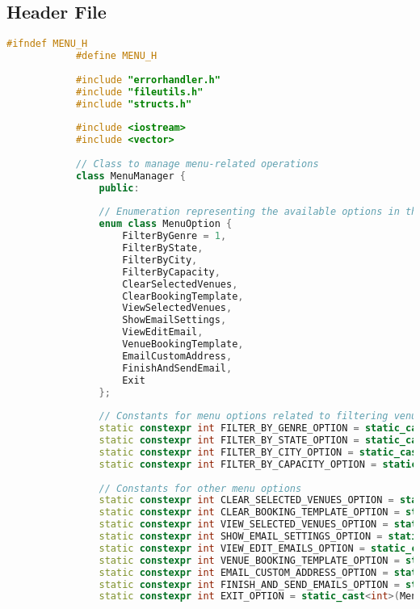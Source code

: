 \documentclass{article}
\begin{document}
	\subsection*{Header File}
	\begin{mdframed}[backgroundcolor=background, hidealllines=false, innerleftmargin=15pt, innerrightmargin=5pt, innertopmargin=0pt, innerbottommargin=-5pt, linecolor=accent]
		\begin{lstlisting}[language=C++]
			#ifndef MENU_H
			#define MENU_H
			
			#include "errorhandler.h"
			#include "fileutils.h"
			#include "structs.h"
			
			#include <iostream>
			#include <vector>
			
			// Class to manage menu-related operations
			class MenuManager {
				public:
				
				// Enumeration representing the available options in the main menu
				enum class MenuOption {
					FilterByGenre = 1,
					FilterByState,
					FilterByCity,
					FilterByCapacity,
					ClearSelectedVenues,
					ClearBookingTemplate,
					ViewSelectedVenues,
					ShowEmailSettings,
					ViewEditEmail,
					VenueBookingTemplate,
					EmailCustomAddress,
					FinishAndSendEmail,
					Exit
				};
				
				// Constants for menu options related to filtering venues
				static constexpr int FILTER_BY_GENRE_OPTION = static_cast<int>(MenuOption::FilterByGenre);
				static constexpr int FILTER_BY_STATE_OPTION = static_cast<int>(MenuOption::FilterByState);
				static constexpr int FILTER_BY_CITY_OPTION = static_cast<int>(MenuOption::FilterByCity);
				static constexpr int FILTER_BY_CAPACITY_OPTION = static_cast<int>(MenuOption::FilterByCapacity);
				
				// Constants for other menu options
				static constexpr int CLEAR_SELECTED_VENUES_OPTION = static_cast<int>(MenuOption::ClearSelectedVenues);
				static constexpr int CLEAR_BOOKING_TEMPLATE_OPTION = static_cast<int>(MenuOption::ClearBookingTemplate);
				static constexpr int VIEW_SELECTED_VENUES_OPTION = static_cast<int>(MenuOption::ViewSelectedVenues);
				static constexpr int SHOW_EMAIL_SETTINGS_OPTION = static_cast<int>(MenuOption::ShowEmailSettings);
				static constexpr int VIEW_EDIT_EMAILS_OPTION = static_cast<int>(MenuOption::ViewEditEmail);
				static constexpr int VENUE_BOOKING_TEMPLATE_OPTION = static_cast<int>(MenuOption::VenueBookingTemplate);
				static constexpr int EMAIL_CUSTOM_ADDRESS_OPTION = static_cast<int>(MenuOption::EmailCustomAddress);
				static constexpr int FINISH_AND_SEND_EMAILS_OPTION = static_cast<int>(MenuOption::FinishAndSendEmail);
				static constexpr int EXIT_OPTION = static_cast<int>(MenuOption::Exit);
				

\end{lstlisting}
\end{mdframed}
\end{document}
